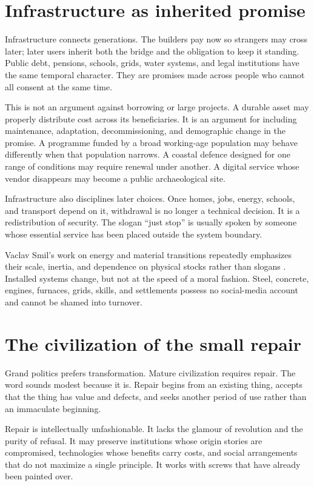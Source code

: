 \documentclass[12pt,a4paper]{book}
\begin{document}
\section{Infrastructure as inherited promise}

Infrastructure connects generations.  The builders pay now so strangers may
cross later; later users inherit both the bridge and the obligation to keep it
standing.  Public debt, pensions, schools, grids, water systems, and legal
institutions have the same temporal character.  They are promises made across
people who cannot all consent at the same time.

This is not an argument against borrowing or large projects.  A durable asset
may properly distribute cost across its beneficiaries.  It is an argument for
including maintenance, adaptation, decommissioning, and demographic change in
the promise.  A programme funded by a broad working-age population may behave
differently when that population narrows.  A coastal defence designed for one
range of conditions may require renewal under another.  A digital service
whose vendor disappears may become a public archaeological site.

Infrastructure also disciplines later choices.  Once homes, jobs, energy,
schools, and transport depend on it, withdrawal is no longer a technical
decision.  It is a redistribution of security.  The slogan ``just stop'' is
usually spoken by someone whose essential service has been placed outside the
system boundary.

Vaclav Smil's work on energy and material transitions repeatedly emphasizes
their scale, inertia, and dependence on physical stocks rather than slogans
\cite{Smil2021}.  Installed systems change, but not at the speed of a moral
fashion.  Steel, concrete, engines, furnaces, grids, skills, and settlements
possess no social-media account and cannot be shamed into turnover.

\section{The civilization of the small repair}

Grand politics prefers transformation.  Mature civilization requires repair.
The word sounds modest because it is.  Repair begins from an existing thing,
accepts that the thing has value and defects, and seeks another period of use
rather than an immaculate beginning.

Repair is intellectually unfashionable.  It lacks the glamour of revolution
and the purity of refusal.  It may preserve institutions whose origin stories
are compromised, technologies whose benefits carry costs, and social
arrangements that do not maximize a single principle.  It works with screws
that have already been painted over.
\end{document}
